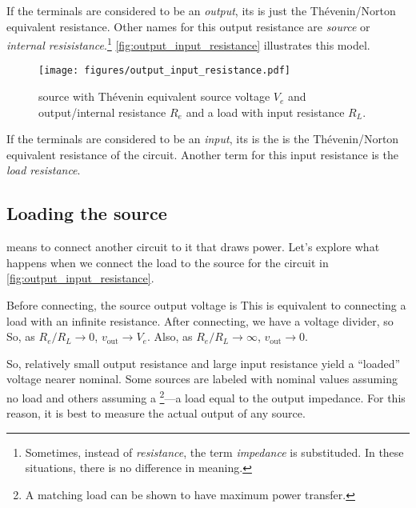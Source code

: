 \documentclass[electronics.tex]{subfiles}
\begin{document}
If the terminals are considered to be an \emph{output}, its  is just the Th\'evenin/Norton equivalent resistance.
Other names for this output resistance are \emph{source} or \emph{internal resisistance}.\footnote{Sometimes, instead of \emph{resistance}, the term \emph{impedance} is substituded. In these situations, there is no difference in meaning.}
\autoref{fig:output_input_resistance} illustrates this model.

\begin{figure}[b]
  \centering
  \texttt{[image: figures/output\_input\_resistance.pdf]}
  \caption{source with Th\'evenin equivalent source voltage $V_e$ and output/internal resistance $R_e$ and a load with input resistance $R_L$.}
  \label{fig:output_input_resistance}
\end{figure}

If the terminals are considered to be an \emph{input}, its  is the is the Th\'evenin/Norton equivalent resistance of the circuit.
Another term for this input resistance is the \emph{load resistance}.

\subsection{Loading the source}
\tags{}

 means to connect another circuit to it that draws power.
Let's explore what happens when we connect the load to the source for the circuit in \autoref{fig:output_input_resistance}.
\tags{}

Before connecting, the source output voltage is
This is equivalent to connecting a load with an infinite resistance.
After connecting, we have a voltage divider, so
So, as $R_e/R_L\rightarrow 0$, $v_\text{out} \rightarrow V_e$.
Also, as $R_e/R_L\rightarrow\infty$, $v_\text{out}\rightarrow 0$.

So, relatively small output resistance and large input resistance yield a ``loaded'' voltage nearer nominal.
Some sources are labeled with nominal values assuming no load and others assuming a \footnote{A matching load can be shown to have maximum power transfer.}---a load equal to the output impedance.
For this reason, it is best to measure the actual output of any source.
\end{document}
